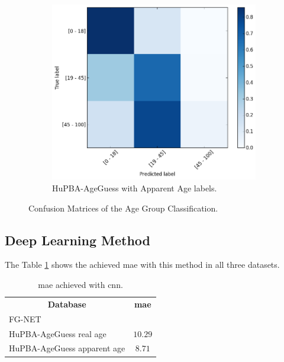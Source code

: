 \begin{figure}[!h]
	\begin{subfigure}[b]{0.5\textwidth}
		\includegraphics[width=\textwidth]{figures/FG-NETconf_mat}
		\caption{HuPBA-AgeGuess with Apparent Age labels.}
		\label{fig:cmapp}
	\end{subfigure}
	\caption{Confusion Matrices of the Age Group Classification.}\label{fig:cm}
\end{figure}


\subsection{Deep Learning Method}

The Table \ref{tab:CNNresults} shows the achieved \gls{mae} with this method in all three datasets. 

\begin{table}[!h]
	\centering
	\begin{tabular}{|l||c|}
		\hline
		\multicolumn{1}{|c||}{\textbf{Database}} & \textbf{\gls{mae}}\\ \hhline{=#=}
		FG-NET & \\ 		\hline
		HuPBA-AgeGuess real age & $10.29$\\ \hline
		HuPBA-AgeGuess apparent age & $8.71$\\ \hline
		
	\end{tabular}
	\caption{\gls{mae} achieved with \gls{cnn}.}
	\label{tab:CNNresults}
\end{table}

